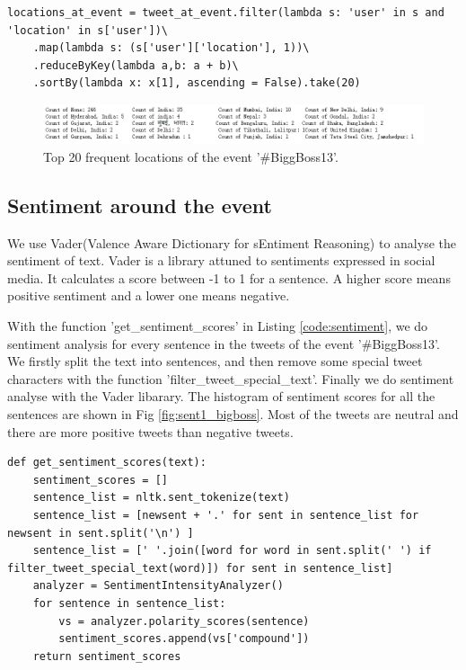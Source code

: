 \begin{lstlisting}[caption=Location of an event, label={code:location}]
locations_at_event = tweet_at_event.filter(lambda s: 'user' in s and 'location' in s['user'])\
    .map(lambda s: (s['user']['location'], 1))\
    .reduceByKey(lambda a,b: a + b)\
    .sortBy(lambda x: x[1], ascending = False).take(20)
\end{lstlisting}

\begin{figure}[H]
    \centering
    \includegraphics[width=1\textwidth]{images/top20_locations_bigboss.png}
    \caption{Top 20 frequent locations of the event '\#BiggBoss13'.}
    \label{fig:top20_locations_bigboss}
\end{figure}

\subsection{Sentiment around the event}


We use Vader(Valence Aware Dictionary for sEntiment Reasoning) \cite{gilbert2014vader} to analyse the sentiment of text. Vader is a library attuned to sentiments expressed in social media. It calculates a score between -1 to 1 for a sentence. A higher score means positive sentiment and a lower one means negative. 

With the function 'get\_sentiment\_scores' in Listing \ref{code:sentiment}, we do sentiment analysis for every sentence in the tweets of the event '\#BiggBoss13'. We firstly split the text into sentences, and then remove some special tweet characters with the function 'filter\_tweet\_special\_text'. Finally we do sentiment analyse with the Vader libarary. The histogram of sentiment scores for all the sentences are shown in Fig \ref{fig:sent1_bigboss}. Most of the tweets are neutral and there are more positive tweets than negative tweets.

\begin{lstlisting}[caption=Sentiment analysis of an event, label={code:sentiment}]
def get_sentiment_scores(text):
    sentiment_scores = []
    sentence_list = nltk.sent_tokenize(text)
    sentence_list = [newsent + '.' for sent in sentence_list for newsent in sent.split('\n') ] 
    sentence_list = [' '.join([word for word in sent.split(' ') if filter_tweet_special_text(word)]) for sent in sentence_list]
    analyzer = SentimentIntensityAnalyzer()
    for sentence in sentence_list:
        vs = analyzer.polarity_scores(sentence)
        sentiment_scores.append(vs['compound'])
    return sentiment_scores
\end{lstlisting}

